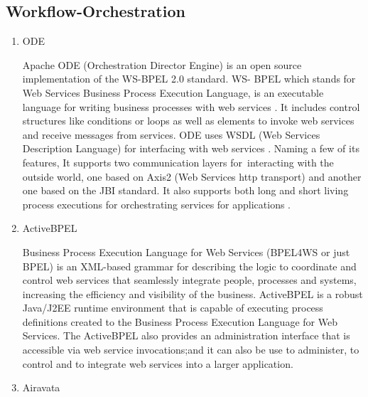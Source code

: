 \subsection{Workflow-Orchestration}
\label{\detokenize{i524/technologies:workflow-orchestration}}\begin{enumerate}
\item {} 
ODE

Apache ODE (Orchestration Director Engine) is an open source
implementation of the WS-BPEL 2.0 standard. WS- BPEL which stands
for  Web Services Business Process Execution Language, is an
executable language for writing business processes with web
services \label{\detokenize{i524/technologies:id1}}{\hyperref[\detokenize{i524/technologies:www-bpel-wiki}]{\sphinxcrossref{{[}1{]}}}}.  It includes control structures
like conditions or loops as well as elements to invoke web services
and receive messages from services.  ODE uses WSDL (Web Services
Description Language) for interfacing with web services
\label{\detokenize{i524/technologies:id2}}{\hyperref[\detokenize{i524/technologies:www-ode-wiki}]{\sphinxcrossref{{[}2{]}}}}. Naming a few of its features, It supports two
communication layers for interacting with the outside world, one
based on Axis2 (Web Services http transport) and another one based
on the JBI standard. It also supports both long and short living
process executions for orchestrating services for applications
\label{\detokenize{i524/technologies:id3}}{\hyperref[\detokenize{i524/technologies:www-ode-web}]{\sphinxcrossref{{[}3{]}}}}.

\item {} 
ActiveBPEL

Business Process Execution Language for Web Services (BPEL4WS or
just BPEL) is an XML-based grammar for describing the logic to
coordinate and control web services that seamlessly integrate
people, processes and systems, increasing the efficiency and
visibility of the business. ActiveBPEL is a robust Java/J2EE
runtime environment that is capable of executing process
definitions created to the Business Process Execution Language for
Web Services. The ActiveBPEL also provides an administration
interface that is accessible via web service invocations;and it can
also be use to administer, to control and to integrate web services
into a larger application. \label{\detokenize{i524/technologies:id4}}{\hyperref[\detokenize{i524/technologies:www-bpel}]{\sphinxcrossref{{[}4{]}}}}

\item {} 
Airavata


\end{enumerate}

